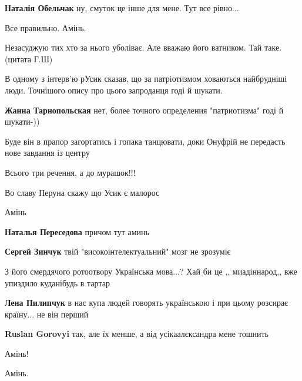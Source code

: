 \begin{itemize}
\begin{itemize} %
\textbf{Наталія Обельчак} ну, смуток це інше для мене. Тут все рівно...
\end{itemize} %

Все правильно. Амінь.


Незасуджую тих хто за нього уболіває. Але вважаю його ватником. Тай таке.
(цитата Г.Ш)


В одному з інтерв'ю рУсик сказав, що за патріотизмом ховаються найбрудніші
люди. Точнішого опису про цього запроданця годі й шукати.

\begin{itemize} %
\textbf{Жанна Тарнопольская} нет, более точного определения "патриотизма" годі й шукати-))
\end{itemize} %

Буде він в прапор загортатись і гопака танцювати, доки Онуфрій не передасть нове завдання із центру

Всього три речення, а до мурашок!!!

Во славу Перуна скажу що Усик є малорос

Амінь

\begin{itemize} %
\textbf{Наталья Переседова} причом тут аминь

\textbf{Сергей Зинчук} твій "високоінтелектуальний" мозг не зрозуміє
\end{itemize} %


З його смердячого ротоотвору Українська мова...? Хай би це ,, миадіннарод,, вже
упиздило куданібудь в тартар

\begin{itemize} %
\textbf{Лена Пилипчук} в нас купа людей говорять українською і при цьому розсирає країну... не він перший

\textbf{Ruslan Gorovyi} так, але їх менше, а від усікаалєксандра мене тошнить
\end{itemize} %

Амінь!

Амінь.


\end{itemize}

